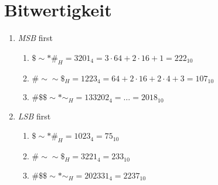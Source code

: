 \documentclass[a4paper]{article}
\begin{document}
\section{Bitwertigkeit}
\begin{enumerate}[label=\alph*)]
    \item \emph{MSB} first
        \begin{enumerate}[label=\Roman*)]
            \item $ \$\sim*\#_H = 3201_4 = 3 \cdot 64 + 2 \cdot 16 + 1 = 222_{10} $

            \item $ \#\sim\sim\$_H = 1223_4 = 64 + 2 \cdot 16 + 2 \cdot 4 + 3 = 107_{10} $

            \item $ \#\$\$\sim*\sim_H = 133202_4 = \dots = 2018_{10} $
        \end{enumerate}

    \item \emph{LSB} first
        \begin{enumerate}[label=\Roman*)]
            \item $ \$\sim*\#_H = 1023_4 = 75_{10} $

            \item $ \#\sim\sim\$_H = 3221_4 = 233_{10} $

            \item $ \#\$\$\sim*\sim_H = 202331_4 = 2237_{10} $
        \end{enumerate}
\end{enumerate}
\end{document}
